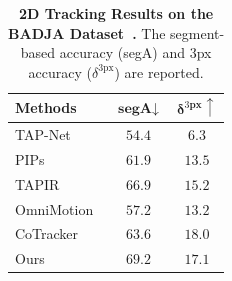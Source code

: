 \begin{table}[t]
\centering\small
\setlength{\tabcolsep}{15pt}
\begin{tabular}{lcc}
\toprule
 \textbf{Methods} & $\textbf{segA}\downarrow$ & $\bm \delta^{3\textbf{px}}\uparrow$ \\
\midrule
TAP-Net~\cite{tap-vid}  &  $54.4$ & $6.3$  \\
PIPs~\cite{pips}  & $61.9$  & $13.5$ \\
TAPIR~\cite{Tapir} & $66.9$ & $15.2$ \\
OmniMotion~\cite{wang2023tracking} & $57.2$ & $13.2$ \\
CoTracker~\cite{cotracker}  & $63.6$ & $\mathbf{18.0}$\\
Ours & $\mathbf{69.2}$ & $17.1$ \\

\bottomrule
\end{tabular}
\vspace{-5pt}
\caption{\textbf{2D Tracking Results on the BADJA Dataset~\cite{BADJA}.} The segment-based accuracy (segA) and 3px accuracy ($\delta^{\text{3px}}$) are reported.}
\label{table:BADJA}
\end{table}
    